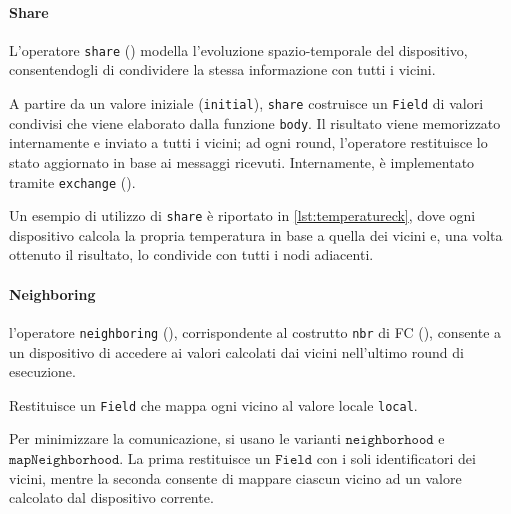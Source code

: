 \paragraph{Share}
\label{sec:collektiveshare}


L’operatore \texttt{share} () modella l'evoluzione spazio-temporale del dispositivo, consentendogli  di condividere la stessa informazione con tutti i vicini.



A partire da un valore iniziale (\texttt{initial}), \texttt{share} costruisce un \texttt{Field} di valori condivisi che viene elaborato dalla funzione \texttt{body}. Il risultato viene memorizzato internamente e inviato a tutti i vicini; ad ogni round, l'operatore restituisce lo stato aggiornato in base ai messaggi ricevuti.
%
Internamente, è implementato tramite \texttt{exchange} ().

Un esempio di utilizzo di \texttt{share} è riportato in \cref{lst:temperatureck}, dove ogni dispositivo calcola la propria temperatura in base a quella dei vicini e, una volta ottenuto il risultato, lo condivide con tutti i nodi adiacenti.


\paragraph{Neighboring} l'operatore \texttt{neighboring} (), corrispondente al costrutto \texttt{nbr} di \ac{FC} (), consente a un dispositivo di accedere ai valori calcolati dai vicini nell'ultimo round di esecuzione.
%

%
Restituisce un \texttt{Field} che mappa ogni vicino al valore locale \texttt{local}.

Per minimizzare la comunicazione, si usano le varianti $\texttt{neighborhood}$ e 
\\
$\texttt{mapNeighborhood}$. La prima restituisce un $\texttt{Field}$ con i soli identificatori dei vicini, mentre la seconda consente di mappare ciascun vicino ad un valore calcolato dal dispositivo corrente.

